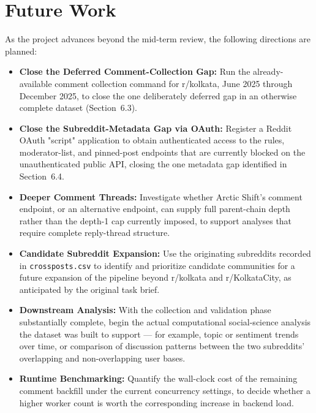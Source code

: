 \documentclass[12pt]{article}
\begin{document}
\section{Future Work}

As the project advances beyond the mid-term review, the following directions are planned:

\begin{itemize}
    \item \textbf{Close the Deferred Comment-Collection Gap:} Run the already-available comment
    collection command for r/kolkata, June 2025 through December 2025, to close the one
    deliberately deferred gap in an otherwise complete dataset (Section~6.3).

    \item \textbf{Close the Subreddit-Metadata Gap via OAuth:} Register a Reddit OAuth "script"
    application to obtain authenticated access to the rules, moderator-list, and pinned-post
    endpoints that are currently blocked on the unauthenticated public API, closing the one
    metadata gap identified in Section~6.4.

    \item \textbf{Deeper Comment Threads:} Investigate whether Arctic Shift's comment endpoint, or
    an alternative endpoint, can supply full parent-chain depth rather than the depth-1 cap
    currently imposed, to support analyses that require complete reply-thread structure.

    \item \textbf{Candidate Subreddit Expansion:} Use the originating subreddits recorded in
    \texttt{crossposts.csv} to identify and prioritize candidate communities for a future
    expansion of the pipeline beyond r/kolkata and r/KolkataCity, as anticipated by the original
    task brief.

    \item \textbf{Downstream Analysis:} With the collection and validation phase substantially
    complete, begin the actual computational social-science analysis the dataset was built to
    support — for example, topic or sentiment trends over time, or comparison of discussion
    patterns between the two subreddits' overlapping and non-overlapping user bases.

    \item \textbf{Runtime Benchmarking:} Quantify the wall-clock cost of the remaining comment
    backfill under the current concurrency settings, to decide whether a higher worker count is
    worth the corresponding increase in backend load.
\end{itemize}
\end{document}
